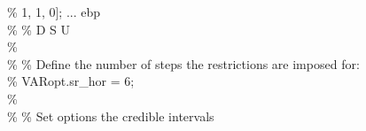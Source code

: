 \hspace{1mm}\hspace{5mm} \hspace{5mm} \hspace{5mm} \hspace{5mm} \hspace{5mm} \textcolor{matlabgreen}{\%          1,       1,      0];       ... ebp }\\ 
\hspace{1mm}\hspace{5mm} \hspace{5mm} \hspace{5mm} \hspace{5mm} \hspace{5mm} \textcolor{matlabgreen}{\%        }\textcolor{matlabgreen}{\% D        S       U    }\\ 
\hspace{1mm}\hspace{5mm} \hspace{5mm} \hspace{5mm} \hspace{5mm} \hspace{5mm} \textcolor{matlabgreen}{\%  }\\ 
\hspace{1mm}\hspace{5mm} \hspace{5mm} \hspace{5mm} \hspace{5mm} \hspace{5mm} \textcolor{matlabgreen}{\% }\textcolor{matlabgreen}{\% Define the number of steps the restrictions are imposed for: }\\ 
\hspace{1mm}\hspace{5mm} \hspace{5mm} \hspace{5mm} \hspace{5mm} \hspace{5mm} \textcolor{matlabgreen}{\% VARopt.sr\_hor = 6; }\\ 
\hspace{1mm}\hspace{5mm} \hspace{5mm} \hspace{5mm} \hspace{5mm} \hspace{5mm} \textcolor{matlabgreen}{\%  }\\ 
\hspace{1mm}\hspace{5mm} \hspace{5mm} \hspace{5mm} \hspace{5mm} \hspace{5mm} \textcolor{matlabgreen}{\% }\textcolor{matlabgreen}{\% Set options the credible intervals }\\ 
